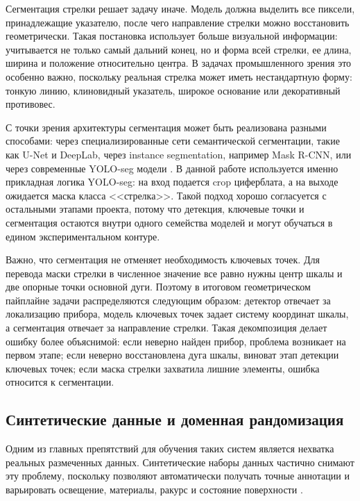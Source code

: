 \documentclass[a4paper,14pt]{extarticle}
\begin{document}
	Сегментация стрелки решает задачу иначе. Модель должна выделить все пиксели, принадлежащие указателю, после чего направление стрелки можно восстановить геометрически. Такая постановка использует больше визуальной информации: учитывается не только самый дальний конец, но и форма всей стрелки, ее длина, ширина и положение относительно центра. В задачах промышленного зрения это особенно важно, поскольку реальная стрелка может иметь нестандартную форму: тонкую линию, клиновидный указатель, широкое основание или декоративный противовес.

	С точки зрения архитектуры сегментация может быть реализована разными способами: через специализированные сети семантической сегментации, такие как U-Net и DeepLab, через instance segmentation, например Mask R-CNN, или через современные YOLO-seg модели \cite{unet2015,deeplab2016,maskrcnn2017,deng2022,linknetYolo2024}. В данной работе используется именно прикладная логика YOLO-seg: на вход подается crop циферблата, а на выходе ожидается маска класса <<стрелка>>. Такой подход хорошо согласуется с остальными этапами проекта, потому что детекция, ключевые точки и сегментация остаются внутри одного семейства моделей и могут обучаться в едином экспериментальном контуре.

	Важно, что сегментация не отменяет необходимость ключевых точек. Для перевода маски стрелки в численное значение все равно нужны центр шкалы и две опорные точки основной дуги. Поэтому в итоговом геометрическом пайплайне задачи распределяются следующим образом: детектор отвечает за локализацию прибора, модель ключевых точек задает систему координат шкалы, а сегментация отвечает за направление стрелки. Такая декомпозиция делает ошибку более объяснимой: если неверно найден прибор, проблема возникает на первом этапе; если неверно восстановлена дуга шкалы, виноват этап детекции ключевых точек; если маска стрелки захватила лишние элементы, ошибка относится к сегментации.

	\subsection{Синтетические данные и доменная рандомизация}

Одним из главных препятствий для обучения таких систем является нехватка реальных размеченных данных. Синтетические наборы данных частично снимают эту проблему, поскольку позволяют автоматически получать точные аннотации и варьировать освещение, материалы, ракурс и состояние поверхности \cite{tobin2017,horvath2023,blenderproc2020,leon2024}.
\end{document}
